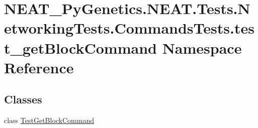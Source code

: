\hypertarget{namespaceNEAT__PyGenetics_1_1NEAT_1_1Tests_1_1NetworkingTests_1_1CommandsTests_1_1test__getBlockCommand}{}\section{N\+E\+A\+T\+\_\+\+Py\+Genetics.\+N\+E\+A\+T.\+Tests.\+Networking\+Tests.\+Commands\+Tests.\+test\+\_\+get\+Block\+Command Namespace Reference}
\label{namespaceNEAT__PyGenetics_1_1NEAT_1_1Tests_1_1NetworkingTests_1_1CommandsTests_1_1test__getBlockCommand}
\subsection*{Classes}
\begin{DoxyCompactItemize}
\item 
class \hyperlink{classNEAT__PyGenetics_1_1NEAT_1_1Tests_1_1NetworkingTests_1_1CommandsTests_1_1test__getBlockCommand_1_1TestGetBlockCommand}{Test\+Get\+Block\+Command}
\end{DoxyCompactItemize}
